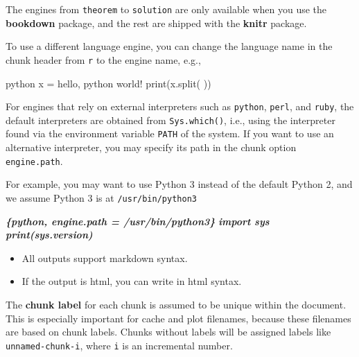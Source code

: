 \documentclass[
]{book}
\newenvironment{Shaded}{\begin{snugshade}}{\end{snugshade}}
\newcommand{\AttributeTok}[1]{\textcolor[rgb]{0.13,0.29,0.53}{#1}}
\newcommand{\InformationTok}[1]{\textcolor[rgb]{0.56,0.35,0.01}{\textbf{\textit{#1}}}}
\newcommand{\StringTok}[1]{\textcolor[rgb]{0.31,0.60,0.02}{#1}}
\providecommand{\tightlist}{%
  \setlength{\itemsep}{0pt}\setlength{\parskip}{0pt}}
\theoremstyle{definition}
\theoremstyle{definition}
\theoremstyle{definition}
\theoremstyle{definition}
\theoremstyle{remark}
\begin{document}
The engines from \texttt{theorem} to \texttt{solution} are only available when you use the \textbf{bookdown} package, and the rest are shipped with the \textbf{knitr} package.

To use a different language engine, you can change the language name in the chunk header from \texttt{r} to the engine name, e.g.,

\begin{Shaded}
\begin{Highlighting}[]
\StringTok{\textasciigrave{}\textasciigrave{}\textasciigrave{}}\AttributeTok{python}
\AttributeTok{x = \textquotesingle{}hello, python world!\textquotesingle{}}
\AttributeTok{print(x.split(\textquotesingle{} \textquotesingle{}))}
\StringTok{\textasciigrave{}\textasciigrave{}\textasciigrave{}}
\end{Highlighting}
\end{Shaded}

For engines that rely on external interpreters such as \texttt{python}, \texttt{perl}, and \texttt{ruby}, the default interpreters are obtained from \texttt{Sys.which()}, i.e., using the interpreter found via the environment variable \texttt{PATH} of the system. If you want to use an alternative interpreter, you may specify its path in the chunk option \texttt{engine.path}.

For example, you may want to use Python 3 instead of the default Python 2, and we assume Python 3 is at \texttt{/usr/bin/python3}

\begin{Shaded}
\begin{Highlighting}[]
\InformationTok{\textasciigrave{}\textasciigrave{}\textasciigrave{}\{python, engine.path = \textquotesingle{}/usr/bin/python3\textquotesingle{}\}}
\InformationTok{import sys}
\InformationTok{print(sys.version)}
\InformationTok{\textasciigrave{}\textasciigrave{}\textasciigrave{}}
\end{Highlighting}
\end{Shaded}

\begin{itemize}
\tightlist
\item
  All outputs support markdown syntax.
\item
  If the output is html, you can write in html syntax.
\end{itemize}

The \textbf{chunk label} for each chunk is assumed to be unique within the document. This is especially important for cache and plot filenames, because these filenames are based on chunk labels. Chunks without labels will be assigned labels like \texttt{unnamed-chunk-i}, where \texttt{i} is an incremental number.
\end{document}
